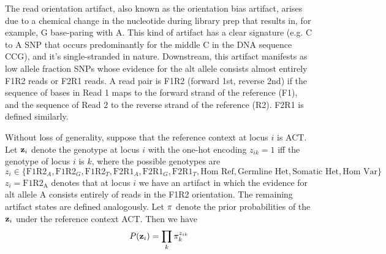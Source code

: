 \documentclass[nofootinbib,amssymb,amsmath]{revtex4}
\newcommand{\vz}{{\bf z}}
\newcommand{\vpi}{{\bf \pi}}
\begin{document}
The read orientation artifact, also known as the orientation bias artifact, arises due to a chemical change in the nucleotide during library prep that results in, for example, G base-paring with A. This kind of artifact has a clear signature (e.g. C to A SNP that occurs predominantly for the middle C in the DNA sequence CCG), and it's single-stranded in nature. Downstream, this artifact manifests as low allele fraction SNPs whose evidence for the alt allele consists almost entirely F1R2 reads or F2R1 reads. A read pair is F1R2 (forward 1st, reverse 2nd) if the sequence of bases in Read 1 maps to the forward strand of the reference (F1), and the sequence of Read 2 to the reverse strand of the reference (R2). F2R1 is defined similarly.

Without loss of generality, suppose that the reference context at locus $i$ is ACT. Let $\vz_i$ denote the genotype at locus $i$ with the one-hot encoding $z_{ik} = 1$ iff the genotype of locus $i$ is $k$, where the possible genotypes are
\begin{equation*}
z_i \in \{ \text{F1R2}_A, \text{F1R2}_G, \text{F1R2}_T, \text{F2R1}_A, \text{F2R1}_G, \text{F2R1}_T,  \text{Hom Ref}, \text{Germline Het}, \text{Somatic Het}, \text{Hom Var} \}
\end{equation*}
$z_i = \mathrm{F1R2_A}$ denotes that at locus $i$ we have an artifact in which the evidence for alt allele A consists entirely of reads in the F1R2 orientation. The remaining artifact states are defined analogously. Let $\vpi$ denote the prior probabilities of the $\vz_i$ under the reference context ACT. Then we have 
\begin{equation}
P(\vz_i) = \prod_k \pi_{k}^{z_{ik}}
\end{equation}
\end{document}
